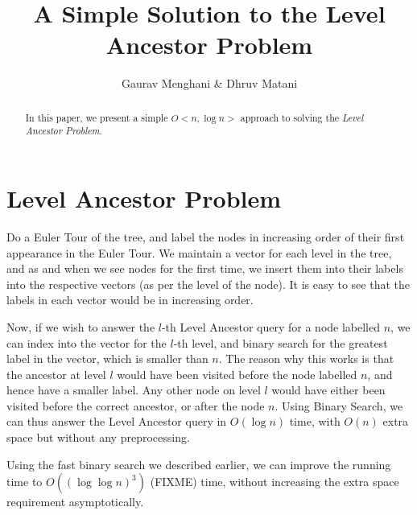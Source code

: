 \documentclass{article}
\title{A Simple Solution to the Level Ancestor Problem}
\author{Gaurav Menghani \& Dhruv Matani}
\begin{document}
\maketitle


\begin{abstract}

In this paper, we present a simple $O\mathrm{<}n, \log{n}\mathrm{>}$
approach to solving the \textit{Level Ancestor Problem}.

\end{abstract}


\section{Level Ancestor Problem}
Do a Euler Tour of the tree, and label the nodes in increasing order of their
first appearance in the Euler Tour. We maintain a vector for each level in the 
tree, and as and when we see nodes for the first time, we insert them into their
labels into the respective vectors (as per the level of the node). It is easy
to see that the labels in each vector would be in increasing order.

Now, if we wish to answer the $l$-th Level Ancestor query for a node labelled $n$,
we can index into the vector for the $l$-th level, and binary search for the 
greatest label in the vector, which is smaller than $n$. The reason why this 
works is that the ancestor at level $l$ would have been visited before the node 
labelled $n$, and hence have a smaller label. Any other node on level $l$ would have
either been visited before the correct ancestor, or after the node $n$. Using
Binary Search, we can thus answer the Level Ancestor query in $O(\log{n})$ time, 
with $O(n)$ extra space but without any preprocessing. 

Using the fast binary search we described earlier, we can improve the running 
time to $O((\log{\log{n}})^3)$ (FIXME) time, without increasing the extra space
requirement asymptotically.
\end{document}
